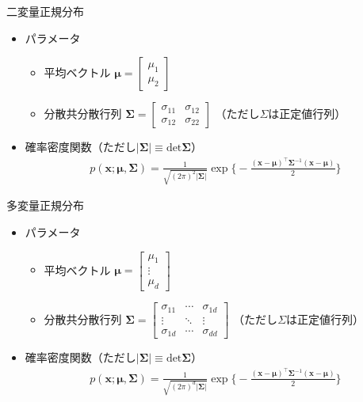 \documentclass[aspectratio=169,unicode,dvipdfmx,14pt]{beamer}
\begin{document}
\begin{frame}{二変量正規分布}
\begin{itemize}
\item パラメータ
\begin{itemize}
\item 平均ベクトル
$\bm{\mu} = \begin{bmatrix} \mu_1 \\ \mu_2 \end{bmatrix}$
\item 分散共分散行列
$\bm{\Sigma} = \begin{bmatrix} \sigma_{11} & \sigma_{12} \\ \sigma_{12} & \sigma_{22} \end{bmatrix}$
（ただし$\Sigma$は正定値行列）
\end{itemize}
\item 確率密度関数（ただし$| \bm{\Sigma} | \equiv \mbox{det}\bm{\Sigma}$）
\begin{align}
p(\bm{x};\bm{\mu},\bm{\Sigma}) = \frac{1}{\sqrt{(2\pi)^2|\bm{\Sigma}|}}\exp\bigg\{ - \frac{(\bm{x} - \bm{\mu})^\intercal \bm{\Sigma}^{-1} (\bm{x} - \bm{\mu})}{2} \bigg\}
\end{align}
\end{itemize}
\end{frame}

\begin{frame}{多変量正規分布}
\begin{itemize}
\item パラメータ
\begin{itemize}
\item 平均ベクトル
$\bm{\mu} = \begin{bmatrix} \mu_1 \\ \vdots \\ \mu_d \end{bmatrix}$
\item 分散共分散行列
$\bm{\Sigma} = \begin{bmatrix} \sigma_{11} & \cdots & \sigma_{1d} \\ 
\vdots & \ddots & \vdots \\
\sigma_{1d} & \cdots & \sigma_{dd} \end{bmatrix}$
（ただし$\Sigma$は正定値行列）
\end{itemize}
\item 確率密度関数（ただし$| \bm{\Sigma} | \equiv \mbox{det}\bm{\Sigma}$）
\begin{align}
p(\bm{x};\bm{\mu},\bm{\Sigma}) = \frac{1}{\sqrt{(2\pi)^d|\bm{\Sigma}|}}\exp\bigg\{ - \frac{(\bm{x} - \bm{\mu})^\intercal \bm{\Sigma}^{-1} (\bm{x} -\bm{\mu})}{2} \bigg\}
\end{align}
\end{itemize}
\end{frame}
\end{document}
